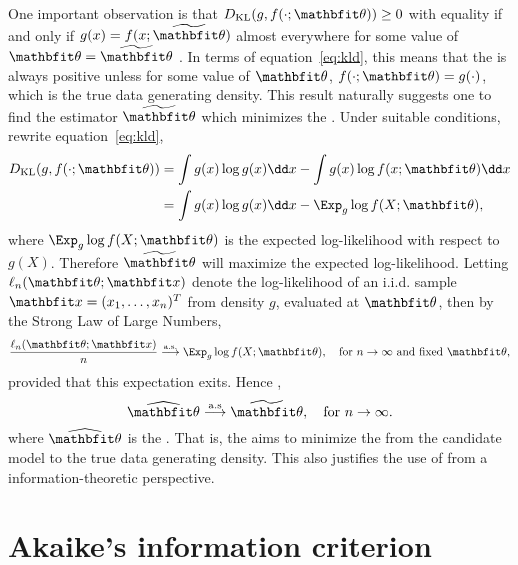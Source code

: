 One important observation is that $\dkl(g,f(\cdot;\bth))\ge0$ with equality if
and only if $g(x) = f(x;\tbth)$ almost everywhere for some value of $\bth =
\tbth$ \parencite{Kullback1951}. In terms of equation~\eqref{eq:kld}, this
means that the \kl is always positive unless for some value of $\bth$,
$f(\cdot;\bth) = g(\cdot)$, which is the true data generating density. This
result naturally suggests one to find the estimator $\tbth$ which minimizes
the \kl. Under suitable conditions, rewrite equation~\eqref{eq:kld},
\begin{align}
  \dkl(g,f(\cdot;\bth))
  & = \int g(x)\log g(x)\dd x - \int g(x)\log f(x;\bth)\dd x \notag\\
  & = \int g(x)\log g(x)\dd x - \Exp_g \log f(X;\bth),
  \label{eq:kl exp ll}
\end{align}
where $\Exp_g\log f(X;\bth)$ is the expected log-likelihood with respect to
$g(X)$. Therefore $\tbth$ will maximize the expected log-likelihood. Letting
$\ell_n(\bth;\bfx)$ denote the log-likelihood of an i.i.d. sample $\bfx =
(x_1,\dots,x_n)^T$ from density $g$, evaluated at $\bth$, then by the Strong
Law of Large Numbers,
\begin{equation}
  \frac{\ell_n(\bth;\bfx)}{n}
  \overset{\mathrm{a.s.}}{\longrightarrow}
  \Exp_g\log f(X;\bth), \quad\text{for } n\to\infty\text{ and fixed }\bth,
  \label{eq:kl consistency}
\end{equation}
provided that this expectation exits. Hence \parencite[see][for
details]{Kullback1951},
\begin{equation}
  \hbth \overset{\mathrm{a.s}}{\longrightarrow} \tbth,
  \quad\text{for } n\to\infty.
\end{equation}
where $\hbth$ is the \mle. That is, the \mle aims to minimize the \kl from the
candidate model to the true data generating density. This also justifies the
use of \mle from a information-theoretic perspective.

\section{Akaike's information criterion}
\label{sec:Akaike's information criterion}

